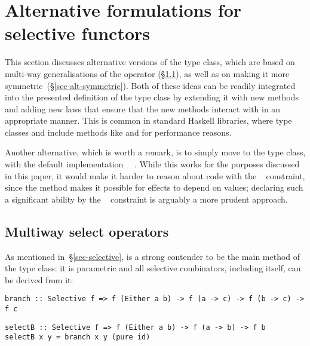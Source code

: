 \section{Alternative formulations for selective functors}
\label{sec-alternatives}

This section discusses alternative versions of the  type class,
which are based on multi-way generalisations of the  operator
(\S\ref{sec-alt-multi}), as well as on making it more
symmetric~(\S\ref{sec-alt-symmetric}). Both of these ideas can be readily
integrated into the presented definition of the  type class by
extending it with new methods and adding new laws that ensure that the
new methods interact with  in an appropriate manner. This is common
in standard Haskell libraries, where type classes  and
 include methods like \hs{*>} and \hs{>>} for performance reasons.

Another alternative, which is worth a remark, is to simply move 
to the  type class, with the default implementation
~\hs{=}~. While this works for the purposes discussed in
this paper, it would make it harder to reason about code with the
~ constraint, since the  method makes it
possible for effects to depend on values; declaring such a significant ability
by the ~ constraint is arguably a more prudent approach.

\subsection{Multiway select operators}\label{sec-alt-multi}

As mentioned in~\S\ref{sec-selective},  is a strong contender to be
the main method of the  type class: it is parametric and all
selective combinators, including  itself, can be derived from it:

\vspace{0.5mm}
\begin{verbatim}
branch :: Selective f => f (Either a b) -> f (a -> c) -> f (b -> c) -> f c
\end{verbatim}
\vspace{0mm}
\begin{verbatim}
selectB :: Selective f => f (Either a b) -> f (a -> b) -> f b
selectB x y = branch x y (pure id)
\end{verbatim}
\vspace{0.5mm}


